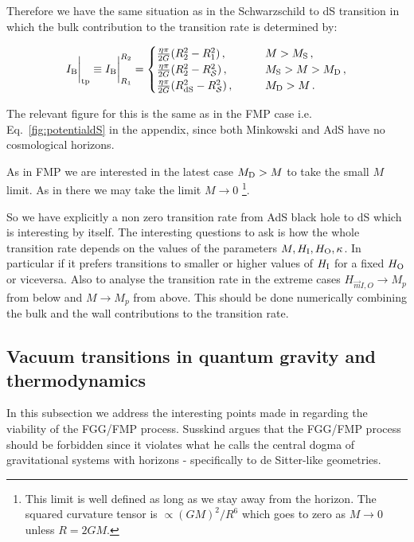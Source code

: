 \documentclass[a4paper,11pt]{article}
\numberwithin{equation}{section}
\newcommand{\citep}{\cite}
\newcommand{\bea}{\begin{eqnarray}}
\newcommand{\eea}{\end{eqnarray}}
\def\m{{\vec{m}}}
\numberwithin{equation}{section}
\begin{document}
Therefore we have the same situation as in the Schwarzschild to dS transition in  which the bulk contribution to the transition rate is determined by:

\bea
I_{{\rm B}}\bigg|_{\rm tp} \equiv I_{{\rm B}}\bigg|_{R_{{\rm 1}}}^{R_{\rm 2}} =\begin{cases}
\frac{\eta\pi}{2G}(R_{2}^{2}-R_{{1}}^{2})\,, \qquad & M > M_{\rm S} \,,\label{eq:SB1}\\
\frac{\eta\pi}{2G}(R_{2}^{2}-R_{\mathcal S}^{2})\,, \qquad & M_{\rm S} > M > M_{\rm D} \,,\label{eq:SB2}\\
\frac{\eta\pi}{2G}(R_{\rm dS}^{2}-R_{\mathcal S}^{2})\,, \qquad & M_{\rm D} > M \,.\label{eq:SB3}
 \end{cases}
\eea

The relevant figure for this is the same as in the FMP case i.e. Eq.~\eqref{fig:potentialdS} in the appendix, since both Minkowski and AdS have no cosmological horizons.


As in FMP we are interested in the latest case $M_{\rm D} > M$ to take the small $M$ limit. As in there we may take the limit $M\rightarrow 0$ \footnote{This limit is well defined as long as we stay away from the horizon. The squared curvature tensor is $\propto (GM)^2/R^6$ which goes to zero as $M\rightarrow 0$ unless $R=2GM$.}.

So we have explicitly a non zero transition rate from AdS black hole to dS which is interesting by itself. The interesting questions to ask is how the whole transition rate depends on the values of the parameters $M,H_{\rm I}, H_{\rm O}, \kappa$. In particular if it prefers transitions to smaller or higher values of $H_{\rm I}$ for a fixed $H_{\rm O}$ or viceversa. Also to analyse the transition rate in the extreme cases $H_{\m I,O}\rightarrow M_p$ from below and $M\rightarrow M_p$ from above. This should be done numerically combining the bulk and the wall contributions to the transition rate.



\subsection{Vacuum transitions in quantum gravity and thermodynamics\label{sec:susskind}}

In this subsection we address the interesting points made in \citep{Susskind:2021yvs} regarding the viability of the FGG/FMP process.  Susskind argues that the FGG/FMP process should be forbidden since it violates
what he calls the central dogma  of gravitational systems with horizons
- specifically to de Sitter-like geometries.
\end{document}
